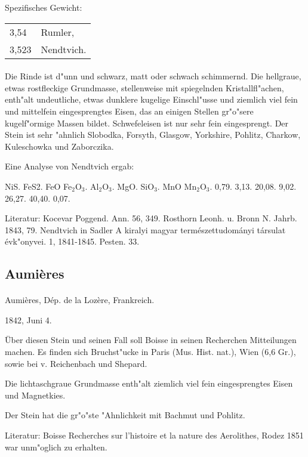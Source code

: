 \documentclass[a4paper, 11pt, oneside]{article}
\begin{document}
Spezifisches Gewicht:  
\begin{table}[!ht]
    \centering
    \begin{tabular}{l l}
        3,54 & Rumler,\\
        3,523 & Nendtvich.
    \end{tabular}
\end{table}
\paragraph{}
Die Rinde ist d"unn und schwarz, matt oder schwach schimmernd. Die hellgraue, etwas rostfleckige Grundmasse, stellenweise mit spiegelnden Kristallfl"achen, enth"alt undeutliche, etwas dunklere kugelige Einschl"usse und ziemlich viel fein und mittelfein eingesprengtes Eisen, das an einigen Stellen gr"o"sere kugelf"ormige Massen bildet. Schwefeleisen ist nur sehr fein eingesprengt. Der Stein ist sehr "ahnlich Slobodka, Forsyth, Glasgow, Yorkshire, Pohlitz, Charkow, Kuleschowka und Zaborczika.

Eine Analyse von Nendtvich ergab:

NiS. FeS2. FeO Fe$_{2}$O$_{3}$. Al$_{2}$O$_{3}$. MgO. SiO$_{3}$. MnO Mn$_{2}$O$_{3}$.  
0,79. 3,13. 20,08. 9,02. 26,27. 40,40. 0,07.

\footnotesize
Literatur: Kocevar Poggend. Ann. 56, 349. Rosthorn Leonh. u. Bronn N. Jahrb. 1843, 79. Nendtvich in Sadler A kiralyi magyar természettudományi társulat évk"onyvei. 1, 1841-1845. Pesten. 33.

\subsection{Aumières}
\normalsize
\paragraph{}
Aumières, Dép. de la Lozère, Frankreich.

1842, Juni 4.

Über diesen Stein und seinen Fall soll Boisse in seinen Recherchen Mitteilungen machen. Es finden sich Bruchst"ucke in Paris (Mus. Hist. nat.), Wien (6,6 Gr.), sowie bei v. Reichenbach und Shepard.

Die lichtaschgraue Grundmasse enth"alt ziemlich viel fein eingesprengtes Eisen und Magnetkies.

Der Stein hat die gr"o"ste "Ahnlichkeit mit Bachmut und Pohlitz.

\footnotesize
Literatur: Boisse Recherches sur l'histoire et la nature des Aerolithes, Rodez 1851 war unm"oglich zu erhalten.
\end{document}
